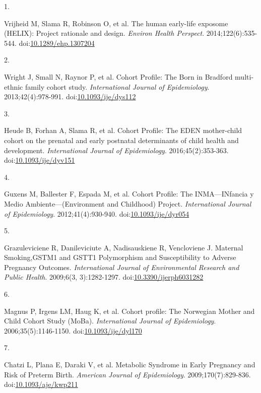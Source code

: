 \documentclass[
  letterpaper,
  DIV=11,
  numbers=noendperiod]{scrartcl}
\newlength{\cslhangindent}
\newlength{\csllabelwidth}
\newenvironment{CSLReferences}[2] %
 {\begin{list}{}{%
  \setlength{\itemindent}{0pt}
  \setlength{\leftmargin}{0pt}
  \setlength{\parsep}{0pt}
  \ifodd #1
   \setlength{\leftmargin}{\cslhangindent}
   \setlength{\itemindent}{-1\cslhangindent}
  \fi
  \setlength{\itemsep}{#2\baselineskip}}}
 {\end{list}}
\newcommand{\CSLLeftMargin}[1]{\parbox[t]{\csllabelwidth}{\strut#1\strut}}
\newcommand{\CSLRightInline}[1]{\parbox[t]{\linewidth - \csllabelwidth}{\strut#1\strut}}
\begin{document}
\label{refs}
\begin{CSLReferences}{0}{1}
\CSLLeftMargin{1. }%
\CSLRightInline{Vrijheid M, Slama R, Robinson O, et al. The human
early-life exposome ({HELIX}): Project rationale and design.
\emph{Environ Health Perspect}. 2014;122(6):535-544.
doi:\href{https://doi.org/10.1289/ehp.1307204}{10.1289/ehp.1307204}}

\CSLLeftMargin{2. }%
\CSLRightInline{Wright J, Small N, Raynor P, et al. Cohort {Profile}:
{The Born} in {Bradford} multi-ethnic family cohort study.
\emph{International Journal of Epidemiology}. 2013;42(4):978-991.
doi:\href{https://doi.org/10.1093/ije/dys112}{10.1093/ije/dys112}}

\CSLLeftMargin{3. }%
\CSLRightInline{Heude B, Forhan A, Slama R, et al. Cohort {Profile}:
{The EDEN} mother-child cohort on the prenatal and early postnatal
determinants of child health and development. \emph{International
Journal of Epidemiology}. 2016;45(2):353-363.
doi:\href{https://doi.org/10.1093/ije/dyv151}{10.1093/ije/dyv151}}

\CSLLeftMargin{4. }%
\CSLRightInline{Guxens M, Ballester F, Espada M, et al. Cohort
{Profile}: {The INMA}---{INfancia} y {Medio Ambiente}---({Environment}
and {Childhood}) {Project}. \emph{International Journal of
Epidemiology}. 2012;41(4):930-940.
doi:\href{https://doi.org/10.1093/ije/dyr054}{10.1093/ije/dyr054}}

\CSLLeftMargin{5. }%
\CSLRightInline{Grazuleviciene R, Danileviciute A, Nadisauskiene R,
Vencloviene J. Maternal {Smoking},{GSTM1} and {GSTT1 Polymorphism} and
{Susceptibility} to {Adverse Pregnancy Outcomes}. \emph{International
Journal of Environmental Research and Public Health}. 2009;6(3,
3):1282-1297.
doi:\href{https://doi.org/10.3390/ijerph6031282}{10.3390/ijerph6031282}}

\CSLLeftMargin{6. }%
\CSLRightInline{Magnus P, Irgens LM, Haug K, et al. Cohort profile: {The
Norwegian Mother} and {Child Cohort Study} ({MoBa}). \emph{International
Journal of Epidemiology}. 2006;35(5):1146-1150.
doi:\href{https://doi.org/10.1093/ije/dyl170}{10.1093/ije/dyl170}}

\CSLLeftMargin{7. }%
\CSLRightInline{Chatzi L, Plana E, Daraki V, et al. Metabolic {Syndrome}
in {Early Pregnancy} and {Risk} of {Preterm Birth}. \emph{American
Journal of Epidemiology}. 2009;170(7):829-836.
doi:\href{https://doi.org/10.1093/aje/kwp211}{10.1093/aje/kwp211}}


\end{CSLReferences}
\end{document}
